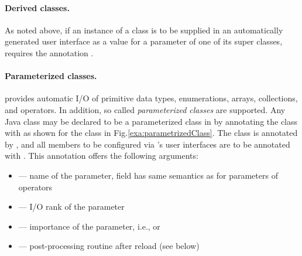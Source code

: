 \paragraph{Derived classes.}
As noted above, 
if an instance of a class is to be supplied in an automatically
generated user interface as a value for a parameter of one of its super classes,
\alida requires the annotation .

\paragraph{Parameterized classes.}
\alida provides automatic I/O of primitive data types, enumerations, arrays, collections,
and operators.
In addition, so called \textit{parameterized classes} are supported.
Any Java class may be declared to be a parameterized class in \alida
by annotating the class with  as shown for the
class  in Fig.\ref{exa:parametrizedClass}.
The class is annotated by ,
and all members to be configured via \alida's user interfaces are
to be annotated with . This annotation offers the
following arguments:
\begin{itemize}
  \item {} --- name of the parameter, field has same
	semantics as for parameters of operators
  \item {} --- I/O rank of the parameter	 
  \item {} ---
	importance of the parameter, i.e.,  or 	 
  \item {} --- post-processing routine after reload (see
  below)
\end{itemize}


